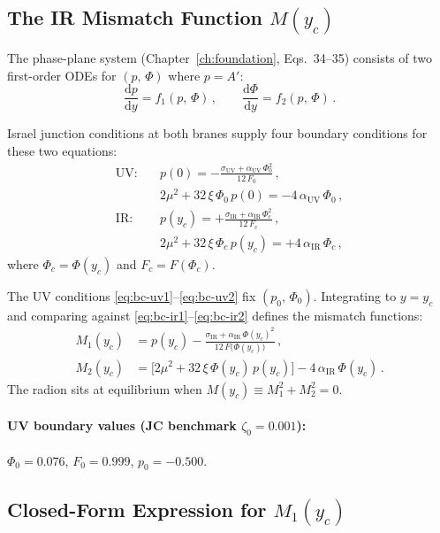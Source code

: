 \subsection{The IR Mismatch Function $M(y_c)$}

The phase-plane system (Chapter~\ref{ch:foundation}, Eqs.~34--35) consists of two first-order ODEs for $(p,\,\Phi)$ where $p = A'$:
\begin{equation}
  \frac{\mathrm{d}p}{\mathrm{d}y} = f_1(p,\,\Phi)\,,\qquad
  \frac{\mathrm{d}\Phi}{\mathrm{d}y} = f_2(p,\,\Phi)\,.
\end{equation}

Israel junction conditions at both branes supply four boundary conditions for these two equations:
\begin{align}
  \text{UV:}\quad
    & p(0) = -\frac{\sigma_{\mathrm{UV}} + \alpha_{\mathrm{UV}}\,\Phi_0^2}{12\,F_0}\,,
    \label{eq:bc-uv1} \\[3pt]
    & 2\mu^2 + 32\,\xi\,\Phi_0\,p(0) = -4\,\alpha_{\mathrm{UV}}\,\Phi_0\,,
    \label{eq:bc-uv2} \\[6pt]
  \text{IR:}\quad
    & p(y_c) = +\frac{\sigma_{\mathrm{IR}} + \alpha_{\mathrm{IR}}\,\Phi_c^2}{12\,F_c}\,,
    \label{eq:bc-ir1} \\[3pt]
    & 2\mu^2 + 32\,\xi\,\Phi_c\,p(y_c) = +4\,\alpha_{\mathrm{IR}}\,\Phi_c\,,
    \label{eq:bc-ir2}
\end{align}
where $\Phi_c = \Phi(y_c)$ and $F_c = F(\Phi_c)$.

The UV conditions \eqref{eq:bc-uv1}--\eqref{eq:bc-uv2} fix $(p_0,\,\Phi_0)$. Integrating to $y = y_c$ and comparing against \eqref{eq:bc-ir1}--\eqref{eq:bc-ir2} defines the mismatch functions:
\begin{align}
  M_1(y_c) &= p(y_c) - \frac{\sigma_{\mathrm{IR}} + \alpha_{\mathrm{IR}}\,\Phi(y_c)^2}{12\,F\bigl(\Phi(y_c)\bigr)}\,, \\[4pt]
  M_2(y_c) &= \bigl[2\mu^2 + 32\,\xi\,\Phi(y_c)\,p(y_c)\bigr] - 4\,\alpha_{\mathrm{IR}}\,\Phi(y_c)\,.
\end{align}
The radion sits at equilibrium when $M(y_c) \equiv M_1^2 + M_2^2 = 0$.

\paragraph{UV boundary values (JC benchmark $\zeta_0 = 0.001$):}
$\Phi_0 = 0.076$, $F_0 = 0.999$, $p_0 = -0.500$.

\subsection{Closed-Form Expression for $M_1(y_c)$}

